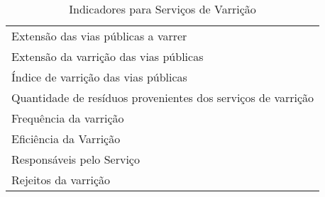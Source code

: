 \begin{table}[h!]
  \centering
  \caption{Indicadores para Serviços de Varrição}
\begin{tabular}{|p{25em}|}
	\rowcolor[rgb]{ .984,  .831,  .706} \multicolumn{1}{P{25em}}{SERVIÇOS DE VARRIÇÃO} \\
	\midrule
	Extensão das vias públicas a varrer \\
	\midrule
	Extensão da varrição das vias públicas \\
	\midrule
	Índice de varrição das vias públicas \\
	\midrule
	Quantidade de resíduos provenientes dos serviços de varrição \\
	\midrule
	Frequência da varrição \\
	\midrule
	Eficiência da Varrição \\
	\midrule
	Responsáveis pelo Serviço \\
	\midrule
	Rejeitos da varrição  \\
	\bottomrule
\end{tabular}%

  \label{tab:ind_varricao}%
\end{table}%
